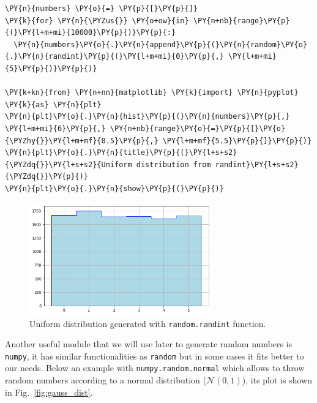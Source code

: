  \begin{tcolorbox}[breakable, size=fbox, boxrule=1pt, pad at break*=1mm,colback=cellbackground, colframe=cellborder]
\begin{Verbatim}[commandchars=\\\{\}]
\PY{n}{numbers} \PY{o}{=} \PY{p}{[}\PY{p}{]}
\PY{k}{for} \PY{n}{\PYZus{}} \PY{o+ow}{in} \PY{n+nb}{range}\PY{p}{(}\PY{l+m+mi}{10000}\PY{p}{)}\PY{p}{:}
  \PY{n}{numbers}\PY{o}{.}\PY{n}{append}\PY{p}{(}\PY{n}{random}\PY{o}{.}\PY{n}{randint}\PY{p}{(}\PY{l+m+mi}{0}\PY{p}{,} \PY{l+m+mi}{5}\PY{p}{)}\PY{p}{)}

\PY{k+kn}{from} \PY{n+nn}{matplotlib} \PY{k}{import} \PY{n}{pyplot} \PY{k}{as} \PY{n}{plt}
\PY{n}{plt}\PY{o}{.}\PY{n}{hist}\PY{p}{(}\PY{n}{numbers}\PY{p}{,} \PY{l+m+mi}{6}\PY{p}{,} \PY{n+nb}{range}\PY{o}{=}\PY{p}{[}\PY{o}{\PYZhy{}}\PY{l+m+mf}{0.5}\PY{p}{,} \PY{l+m+mf}{5.5}\PY{p}{]}\PY{p}{)}
\PY{n}{plt}\PY{o}{.}\PY{n}{title}\PY{p}{(}\PY{l+s+s2}{\PYZdq{}}\PY{l+s+s2}{Uniform distribution from randint}\PY{l+s+s2}{\PYZdq{}}\PY{p}{)}
\PY{n}{plt}\PY{o}{.}\PY{n}{show}\PY{p}{(}\PY{p}{)}
\end{Verbatim}
\end{tcolorbox}

\begin{figure}[h]
\centering
\includegraphics[width=0.7\textwidth]{lesson4_files/lesson4_3_0.png}
\caption{Uniform distribution generated with \texttt{random.randint} function.}
\label{fig:uniform_dist}
\end{figure}
    
Another useful module that we will use later to generate random numbers is \texttt{numpy}, it has similar functionalities as \texttt{random} but in some cases it fits better to our needs.    
Below an example with \texttt{numpy.random.normal} which allows to throw random numbers according to a normal distribution
(\(\mathcal{N}(0, 1)\)), its plot is shown in Fig.~\ref{fig:gauss_dist}.

